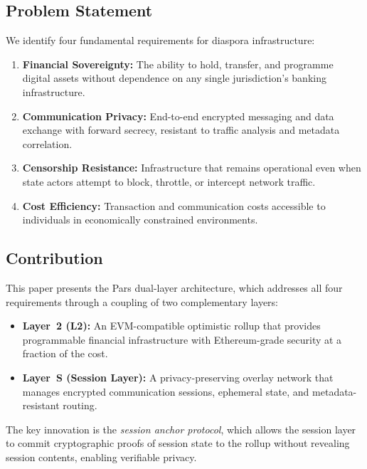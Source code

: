 \documentclass[11pt,a4paper]{article}
\begin{document}
\subsection{Problem Statement}

We identify four fundamental requirements for diaspora infrastructure:

\begin{enumerate}[label=(\roman*)]
    \item \textbf{Financial Sovereignty:} The ability to hold, transfer, and
    programme digital assets without dependence on any single jurisdiction's
    banking infrastructure.

    \item \textbf{Communication Privacy:} End-to-end encrypted messaging and
    data exchange with forward secrecy, resistant to traffic analysis and
    metadata correlation.

    \item \textbf{Censorship Resistance:} Infrastructure that remains
    operational even when state actors attempt to block, throttle, or
    intercept network traffic.

    \item \textbf{Cost Efficiency:} Transaction and communication costs
    accessible to individuals in economically constrained environments.
\end{enumerate}

\subsection{Contribution}

This paper presents the Pars dual-layer architecture, which addresses all
four requirements through a coupling of two complementary layers:

\begin{itemize}
    \item \textbf{Layer~2 (L2):} An EVM-compatible optimistic rollup that
    provides programmable financial infrastructure with Ethereum-grade
    security at a fraction of the cost.

    \item \textbf{Layer~S (Session Layer):} A privacy-preserving overlay
    network that manages encrypted communication sessions, ephemeral state,
    and metadata-resistant routing.
\end{itemize}

The key innovation is the \emph{session anchor protocol}, which allows the
session layer to commit cryptographic proofs of session state to the rollup
without revealing session contents, enabling verifiable privacy.
\end{document}
